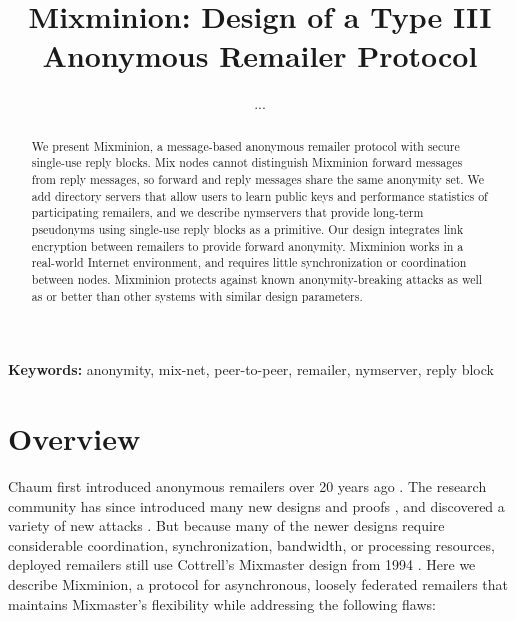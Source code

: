 \documentclass[11pt]{IEEEtran}
\newcommand\emailaddr{\begingroup \def\UrlLeft{<}\def\UrlRight{>}\urlstyle{tt}\Url}
\begin{document}

\title{Mixminion: Design of a Type III Anonymous Remailer Protocol}

% 
\author{...}

\maketitle
\pagestyle{plain} 
 
\begin{abstract}
We present Mixminion, a message-based anonymous remailer protocol with
secure single-use reply blocks. Mix nodes cannot distinguish
Mixminion forward messages from reply messages, so forward and reply
messages share
the same anonymity set. We add directory servers that allow users to
learn public keys and performance statistics of participating remailers,
and we describe nymservers that provide long-term
pseudonyms using single-use reply blocks as a primitive. Our design
integrates link encryption between remailers to provide
forward anonymity. Mixminion works in a real-world Internet environment,
and requires little synchronization or coordination between nodes.
Mixminion protects against known anonymity-breaking attacks as well
as or better than other systems with similar design parameters.
\end{abstract}

\begin{center}
\textbf{Keywords:} anonymity, mix-net, peer-to-peer, remailer, nymserver, reply block
\end{center}


\section{Overview}
\label{sec:intro}

Chaum first introduced anonymous remailers over 20 years ago
\cite{chaum-mix}.
The research community has since introduced many new
designs and proofs
\cite{abe}\cite{babel}\cite{flash-mix}\cite{kesdogan}\cite{shuffle}\cite{hybrid-mix}, 
and discovered a variety of new attacks 
\cite{back-traffic-analysis}\cite{langos02}\cite{disad-free-routes}\cite{desmedt}\cite{mitkuro}\cite{raymond00}.
But because many of the newer designs require considerable coordination,
synchronization, bandwidth, or processing resources, deployed remailers still use
Cottrell's Mixmaster design from 1994
\cite{mixmaster-attacks}\cite{mixmaster-spec}. Here we describe Mixminion, a
protocol for asynchronous, loosely federated remailers that maintains
Mixmaster's flexibility while addressing the following flaws:
\end{document}

